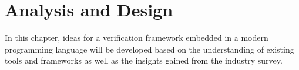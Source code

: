 \chapter{Analysis and Design}


In this chapter, ideas for a verification framework embedded in a modern programming language will be developed based
on the understanding of existing tools and frameworks as well as the insights gained from the industry survey.

